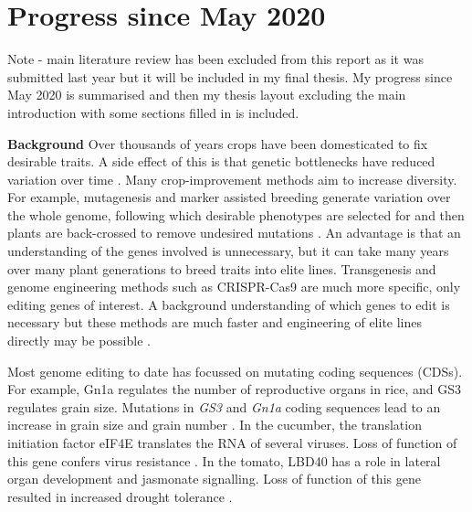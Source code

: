 \documentclass[../main.tex]{subfiles}
\begin{document}
\chapter{Progress since May 2020}\label{progress}
Note - main literature review has been excluded from this report as it was submitted last year but it will be included in my final thesis.
My progress since May 2020 is summarised and then my thesis layout excluding the main introduction with some sections filled in is included.

\textbf{Background}
Over thousands of years crops have been domesticated to fix desirable traits.
A side effect of this is that genetic bottlenecks have reduced variation over time \autocite{tanksleySeedBanksMolecular1997}.
Many crop\hyp{}improvement methods aim to increase diversity.
For example, mutagenesis and marker assisted breeding generate variation over the whole genome, following which desirable phenotypes are selected for and then plants are back\hyp{}crossed to remove undesired mutations \autocite{tuberosaMarkerAssistedbreedingBreedSee2012}.
An advantage is that an understanding of the genes involved is unnecessary, but it can take many years over many plant generations to breed traits into elite lines.
Transgenesis and genome engineering methods such as CRISPR\hyp{}Cas9 are much more specific, only editing genes of interest.
A background understanding of which genes to edit is necessary but these methods are much faster and engineering of elite lines directly may be possible \autocite{sedeekPlantGenomeEngineering2019}.

Most genome editing to date has focussed on mutating coding sequences (CDSs).
For example, Gn1a regulates the number of reproductive organs in rice, and GS3 regulates grain size.
Mutations in \textit{GS3} and \textit{Gn1a} coding sequences lead to an increase in grain size and grain number \autocite{shenQTLEditingConfers2018}.
In the cucumber, the translation initiation factor eIF4E translates the RNA of several viruses.
Loss of function of this gene confers virus resistance \autocite{chandrasekaranDevelopmentBroadVirus2016}.
In the tomato, LBD40 has a role in lateral organ development and jasmonate signalling.
Loss of function of this gene resulted in increased drought tolerance \autocite{liuCRISPRCas9Targeted2020}.
\end{document}
